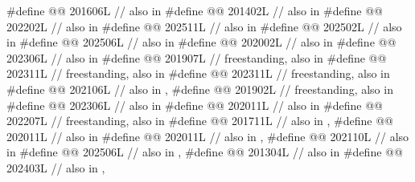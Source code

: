 \begin{codeblock}
#define @@              201606L // also in 
#define @@                201402L // also in 
#define @@                             202202L // also in 
#define @@                              202511L // also in 
#define @@                      202502L // also in 
#define @@                 202506L // also in 
#define @@           202002L // also in 
#define @@          202306L // also in 
#define @@                   201907L // freestanding, also in 
#define @@                              202311L // freestanding, also in 
#define @@             202311L // freestanding, also in 
#define @@                        202106L // also in , 
#define @@                             201902L // freestanding, also in 
#define @@          202306L // also in 
#define @@                        202011L // also in 
#define @@                 202207L // freestanding, also in 
#define @@                  201711L // also in , 
#define @@                       202011L // also in 
#define @@                   202011L // also in , 
#define @@       202110L // also in 
#define @@                    202506L // also in , 
#define @@                       201304L // also in 
#define @@                       202403L // also in , 

\end{codeblock}
